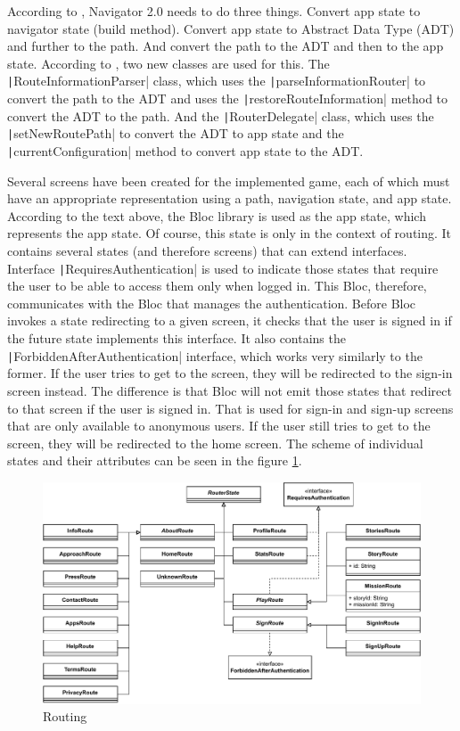 According to \cite{kietay_2021_navigator}, Navigator 2.0 needs to do three things.
Convert app state to navigator state (build method).
Convert app state to Abstract Data Type (ADT) and further to the path.
And convert the path to the ADT and then to the app state.
According to \cite{ryan_2020_navigator}, two new classes are used for this.
The \texttt|RouteInformationParser| class, which uses the \texttt|parseInformationRouter| to convert the path to the ADT and uses the \texttt|restoreRouteInformation| method to convert the ADT to the path.
And the \texttt|RouterDelegate| class, which uses the \texttt|setNewRoutePath| to convert the ADT to app state and the \texttt|currentConfiguration| method to convert app state to the ADT.

Several screens have been created for the implemented game, each of which must have an appropriate representation using a path, navigation state, and app state.
According to the text above, the Bloc library is used as the app state, which represents the app state.
Of course, this state is only in the context of routing.
It contains several states (and therefore screens) that can extend interfaces.
Interface \texttt|RequiresAuthentication| is used to indicate those states that require the user to be able to access them only when logged in.
This Bloc, therefore, communicates with the Bloc that manages the authentication.
Before Bloc invokes a state redirecting to a given screen, it checks that the user is signed in if the future state implements this interface.
It also contains the \texttt|ForbiddenAfterAuthentication| interface, which works very similarly to the former.
If the user tries to get to the screen, they will be redirected to the sign-in screen instead.
The difference is that Bloc will not emit those states that redirect to that screen if the user is signed in.
That is used for sign-in and sign-up screens that are only available to anonymous users.
If the user still tries to get to the screen, they will be redirected to the home screen.
The scheme of individual states and their attributes can be seen in the figure \ref{fig:routing}.

\begin{figure}
    \centering
    \includegraphics[width=1\linewidth]{assets/implementation/routing.pdf}
    \caption{Routing}
    \label{fig:routing}
\end{figure}


